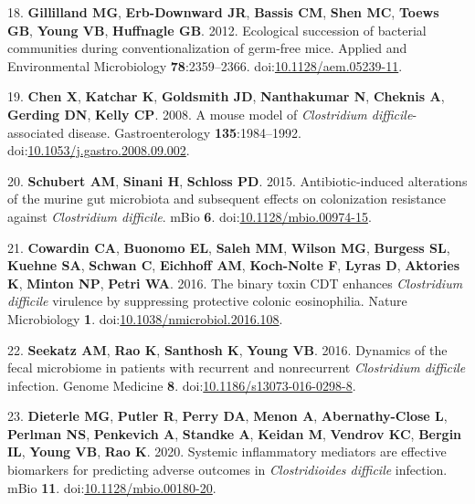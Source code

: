 \documentclass[
  12pt,
]{article}
\newenvironment{cslreferences}%
  {}%
  {\par}
\begin{document}
\begin{cslreferences}
\leavevmode\hypertarget{ref-Gillilland2012}{}%
18. \textbf{Gillilland MG}, \textbf{Erb-Downward JR}, \textbf{Bassis
CM}, \textbf{Shen MC}, \textbf{Toews GB}, \textbf{Young VB},
\textbf{Huffnagle GB}. 2012. Ecological succession of bacterial
communities during conventionalization of germ-free mice. Applied and
Environmental Microbiology \textbf{78}:2359--2366.
doi:\href{https://doi.org/10.1128/aem.05239-11}{10.1128/aem.05239-11}.

\leavevmode\hypertarget{ref-Chen2008}{}%
19. \textbf{Chen X}, \textbf{Katchar K}, \textbf{Goldsmith JD},
\textbf{Nanthakumar N}, \textbf{Cheknis A}, \textbf{Gerding DN},
\textbf{Kelly CP}. 2008. A mouse model of \emph{Clostridium
difficile}-associated disease. Gastroenterology \textbf{135}:1984--1992.
doi:\href{https://doi.org/10.1053/j.gastro.2008.09.002}{10.1053/j.gastro.2008.09.002}.

\leavevmode\hypertarget{ref-Schubert2015}{}%
20. \textbf{Schubert AM}, \textbf{Sinani H}, \textbf{Schloss PD}. 2015.
Antibiotic-induced alterations of the murine gut microbiota and
subsequent effects on colonization resistance against \emph{Clostridium
difficile}. mBio \textbf{6}.
doi:\href{https://doi.org/10.1128/mbio.00974-15}{10.1128/mbio.00974-15}.

\leavevmode\hypertarget{ref-Cowardin2016}{}%
21. \textbf{Cowardin CA}, \textbf{Buonomo EL}, \textbf{Saleh MM},
\textbf{Wilson MG}, \textbf{Burgess SL}, \textbf{Kuehne SA},
\textbf{Schwan C}, \textbf{Eichhoff AM}, \textbf{Koch-Nolte F},
\textbf{Lyras D}, \textbf{Aktories K}, \textbf{Minton NP}, \textbf{Petri
WA}. 2016. The binary toxin CDT enhances \emph{Clostridium difficile}
virulence by suppressing protective colonic eosinophilia. Nature
Microbiology \textbf{1}.
doi:\href{https://doi.org/10.1038/nmicrobiol.2016.108}{10.1038/nmicrobiol.2016.108}.

\leavevmode\hypertarget{ref-Seekatz2016}{}%
22. \textbf{Seekatz AM}, \textbf{Rao K}, \textbf{Santhosh K},
\textbf{Young VB}. 2016. Dynamics of the fecal microbiome in patients
with recurrent and nonrecurrent \emph{Clostridium difficile} infection.
Genome Medicine \textbf{8}.
doi:\href{https://doi.org/10.1186/s13073-016-0298-8}{10.1186/s13073-016-0298-8}.

\leavevmode\hypertarget{ref-Dieterle2020}{}%
23. \textbf{Dieterle MG}, \textbf{Putler R}, \textbf{Perry DA},
\textbf{Menon A}, \textbf{Abernathy-Close L}, \textbf{Perlman NS},
\textbf{Penkevich A}, \textbf{Standke A}, \textbf{Keidan M},
\textbf{Vendrov KC}, \textbf{Bergin IL}, \textbf{Young VB}, \textbf{Rao
K}. 2020. Systemic inflammatory mediators are effective biomarkers for
predicting adverse outcomes in \emph{Clostridioides difficile}
infection. mBio \textbf{11}.
doi:\href{https://doi.org/10.1128/mbio.00180-20}{10.1128/mbio.00180-20}.


\end{cslreferences}
\end{document}
